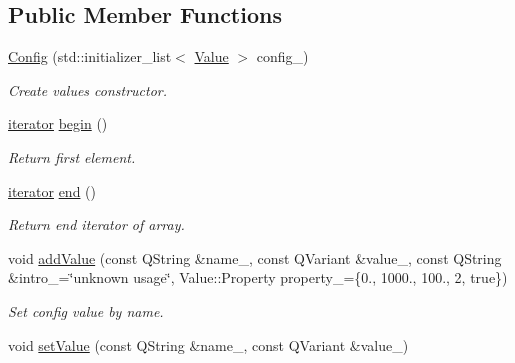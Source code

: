 \subsection*{Public Member Functions}
\begin{DoxyCompactItemize}
\item 
\mbox{\label{classeven_1_1_config_af1d64e9c98c349f317347c127a60be91}} 
\mbox{\hyperlink{classeven_1_1_config_af1d64e9c98c349f317347c127a60be91}{Config}} (std\+::initializer\+\_\+list$<$ \mbox{\hyperlink{classeven_1_1_value}{Value}} $>$ config\+\_\+)
\begin{DoxyCompactList}\small\item\em Create values constructor. \end{DoxyCompactList}\item 
\mbox{\label{classeven_1_1_config_aff3dcebc47bf4d675aa5c6b3e37fe15a}} 
\mbox{\hyperlink{classeven_1_1_config_a73a9be0e3c55ee84a7300c2e271ae541}{iterator}} \mbox{\hyperlink{classeven_1_1_config_aff3dcebc47bf4d675aa5c6b3e37fe15a}{begin}} ()
\begin{DoxyCompactList}\small\item\em Return first element. \end{DoxyCompactList}\item 
\mbox{\label{classeven_1_1_config_af523876290a8009957229be582f3d675}} 
\mbox{\hyperlink{classeven_1_1_config_a73a9be0e3c55ee84a7300c2e271ae541}{iterator}} \mbox{\hyperlink{classeven_1_1_config_af523876290a8009957229be582f3d675}{end}} ()
\begin{DoxyCompactList}\small\item\em Return end iterator of array. \end{DoxyCompactList}\item 
void \mbox{\hyperlink{classeven_1_1_config_a8c33e2414b69788623d7f0fd0280de6d}{add\+Value}} (const Q\+String \&name\+\_\+, const Q\+Variant \&value\+\_\+, const Q\+String \&intro\+\_\+=\char`\"{}unknown usage\char`\"{}, Value\+::\+Property property\+\_\+=\{0., 1000., 100., 2, true\})
\begin{DoxyCompactList}\small\item\em Set config value by name. \end{DoxyCompactList}\item 
void \mbox{\hyperlink{classeven_1_1_config_a05dfde7c5dd017149b847faf35ab0f80}{set\+Value}} (const Q\+String \&name\+\_\+, const Q\+Variant \&value\+\_\+)

\end{DoxyCompactItemize}
